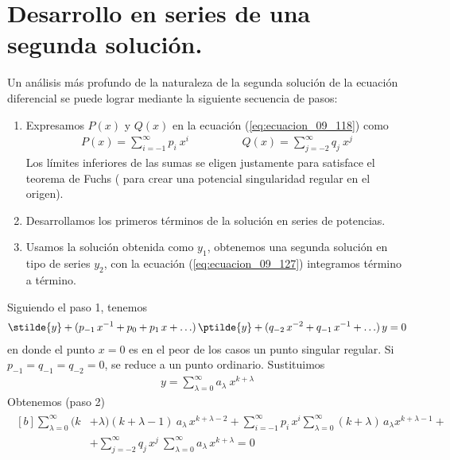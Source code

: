 \section{Desarrollo en series de una segunda solución.}
Un análisis más profundo de la naturaleza de la segunda solución de la ecuación diferencial se puede lograr mediante la siguiente secuencia de pasos:
\begin{enumerate}
\item Expresamos $P(x)$ y $Q(x)$ en la ecuación (\ref{eq:ecuacion_09_118}) como
\begin{align}
P(x) = \sum_{i=-1}^{\infty} p_{i} \: x^{i} \hspace{2cm} Q(x) = \sum_{j=-2}^{\infty} q_{j} \: x^{j}
\label{eq:ecuacion_09_129}
\end{align}
Los límites inferiores de las sumas se eligen justamente para satisface el teorema de Fuchs ( para crear una potencial singularidad regular en el origen).
\item Desarrollamos los primeros términos de la solución en series de potencias.
\item Usamos la solución obtenida como $y_{1}$, obtenemos una segunda solución en tipo de series $y_{2}$, con la ecuación (\ref{eq:ecuacion_09_127}) integramos término a término.
\end{enumerate}
Siguiendo el paso 1, tenemos
\begin{align}
\stilde{y} + (p_{-1} \, x^{-1} + p_{0} + p_{1} \, x + \ldots) \, \ptilde{y} + (q_{-2} \, x^{-2} + q_{-1} \, x^{-1} + \ldots) \, y = 0
\label{eq:ecuacion_09_130}
\end{align}
en donde el punto $x = 0$ es en el peor de los casos un punto singular regular. Si $p_{-1} = q_{-1} = q_{-2} = 0$, se reduce a un punto ordinario. Sustituimos
\begin{align*}
y = \sum_{\lambda = 0}^{\infty} a_{\lambda} \: x^{k + \lambda}
\end{align*}
Obtenemos (paso 2)
\begin{align}
\begin{aligned}[b]
\sum_{\lambda=0}^{\infty} (k &+ \lambda)(k + \lambda - 1) \: a_{\lambda} \, x^{k + \lambda - 2} + \sum_{i=-1}^{\infty} p_{i} \, x^{i} \sum_{\lambda=0}^{\infty} (k + \lambda) \,  a_{\lambda} x^{k + \lambda - 1} + \\
&+ \sum_{j=-2}^{\infty} q_{j} \, x^{j} \: \sum_{\lambda=0}^{\infty} a_{\lambda} \, x^{k + \lambda} = 0
\end{aligned}
\label{eq:ecuacion_09_131}
\end{align}
